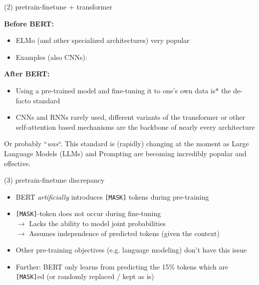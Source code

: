 \documentclass[11pt,compress,t,notes=noshow, xcolor=table]{beamer}
\begin{document}
\begin{frame}{(2) pretrain-finetune + transformer}

\vfill

\textbf{Before BERT:} 
			\begin{itemize}
				\item ELMo (and other specialized architectures) very popular
				\item Examples (also CNNs): 
			\end{itemize}
\textbf{After BERT:}
			\begin{itemize}
				\item Using a pre-trained model and fine-tuning it to one's own data is* the de-facto standard
				\item CNNs and RNNs rarely used, different variants of the transformer or other self-attention based mechanisms are the backbone of nearly every architecture
			\end{itemize}

\vfill

{\scriptsize *Or probably ``\textit{was}``. This standard is (rapidly) changing at the moment as Large Language Models (LLMs) and Prompting are becoming incredibly popular and effective.}
\end{frame}


\begin{frame}{(3) pretrain-finetune discrepancy}

\vfill

	\begin{itemize}
		\item BERT \textit{artificially} introduces \texttt{[MASK]} tokens during pre-training
		\item \texttt{[MASK]}-token does not occur during fine-tuning\\
					$\rightarrow$ Lacks the ability to model joint probabilities\\
					$\rightarrow$ Assumes independence of predicted tokens (given the context)
		\item Other pre-training objectives (e.g. language modeling) don't have this issue
		\item Further: BERT only learns from predicting the 15\% tokens which are \texttt{[MASK]}ed (or randomly replaced / kept as is)
	\end{itemize}

\vfill

\end{frame}
\end{document}

